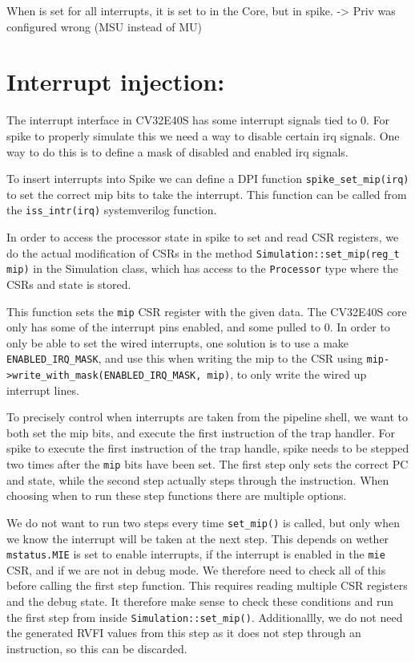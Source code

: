 When  is set for all interrupts, it is set to  in the Core, but  in spike.
-> Priv was configured wrong (MSU instead of MU)

\section{Interrupt injection: }

The interrupt interface in CV32E40S has some interrupt signals tied to 0. For spike to properly simulate this we need a way to disable certain irq signals. One way to do this is to define a mask of disabled and enabled irq signals.


To insert interrupts into Spike we can define a DPI function \lstinline{spike_set_mip(irq)} to set the correct mip bits to take the interrupt. This function can be called from the \lstinline{iss_intr(irq)} systemverilog function.

In order to access the processor state in spike to set and read CSR registers, we do the actual modification of CSRs in the method \lstinline{Simulation::set_mip(reg_t mip)} in the Simulation class, which has access to the \lstinline{Processor} type where the CSRs and state is stored.

This function sets the \lstinline{mip} CSR register with the given data. The CV32E40S core only has some of the interrupt pins enabled, and some pulled to 0\cite{openhwgroupExceptionsInterruptsCOREV2023}. In order to only be able to set the wired interrupts, one solution is to use a make \lstinline{ENABLED_IRQ_MASK}, and use this when writing the mip to the CSR using \lstinline{mip->write_with_mask(ENABLED_IRQ_MASK, mip)}, to only write the wired up interrupt lines.


To precisely control when interrupts are taken from the pipeline shell, we want to both set the mip bits, and execute the first instruction of the trap handler. For spike to execute the first instruction of the trap handle, spike needs to be stepped two times after the \lstinline{mip} bits have been set. The first step only sets the correct PC and state, while the second step actually steps through the instruction. When choosing when to run these step functions there are multiple options.

We do not want to run two steps every time \lstinline{set_mip()} is called, but only when we know the interrupt will be taken at the next step. This depends on wether \lstinline{mstatus.MIE} is set to enable interrupts, if the interrupt is enabled in the \lstinline{mie} CSR, and if we are not in debug mode. We therefore need to check all of this before calling the first step function. This requires reading multiple CSR registers and the debug state. It therefore make sense to check these conditions and run the first step from inside \lstinline{Simulation::set_mip()}. Additionallly, we do not need the generated RVFI values from this step as it does not step through an instruction, so this can be discarded.

